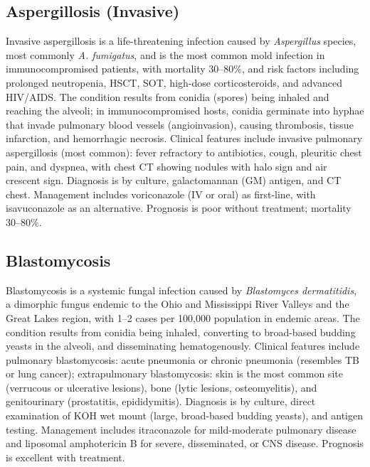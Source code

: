\subsection{Aspergillosis (Invasive)}
\label{sec:Aspergillosis Invasive}
Invasive aspergillosis is a life-threatening infection caused by \textit{Aspergillus} species, most commonly \textit{A. fumigatus}, and is the most common mold infection in immunocompromised patients, with mortality 30--80\%, and risk factors including prolonged neutropenia, HSCT, SOT, high-dose corticosteroids, and advanced HIV/AIDS. The condition results from conidia (spores) being inhaled and reaching the alveoli; in immunocompromised hosts, conidia germinate into hyphae that invade pulmonary blood vessels (angioinvasion), causing thrombosis, tissue infarction, and hemorrhagic necrosis. Clinical features include invasive pulmonary aspergillosis (most common): fever refractory to antibiotics, cough, pleuritic chest pain, and dyspnea, with chest CT showing nodules with halo sign and air crescent sign. Diagnosis is by culture, galactomannan (GM) antigen, and CT chest. Management includes voriconazole (IV or oral) as first-line, with isavuconazole as an alternative. Prognosis is poor without treatment; mortality 30--80\%.

\subsection{Blastomycosis}
\label{sec:Blastomycosis}
Blastomycosis is a systemic fungal infection caused by \textit{Blastomyces dermatitidis}, a dimorphic fungus endemic to the Ohio and Mississippi River Valleys and the Great Lakes region, with 1--2 cases per 100,000 population in endemic areas. The condition results from conidia being inhaled, converting to broad-based budding yeasts in the alveoli, and disseminating hematogenously. Clinical features include pulmonary blastomycosis: acute pneumonia or chronic pneumonia (resembles TB or lung cancer); extrapulmonary blastomycosis: skin is the most common site (verrucous or ulcerative lesions), bone (lytic lesions, osteomyelitis), and genitourinary (prostatitis, epididymitis). Diagnosis is by culture, direct examination of KOH wet mount (large, broad-based budding yeasts), and antigen testing. Management includes itraconazole for mild-moderate pulmonary disease and liposomal amphotericin B for severe, disseminated, or CNS disease. Prognosis is excellent with treatment.


